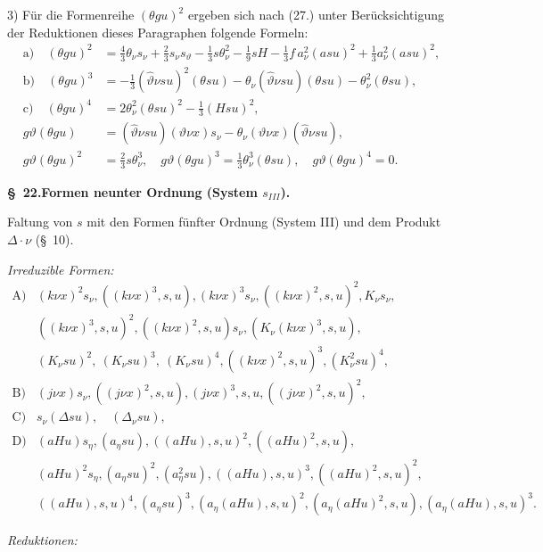 \documentclass[11pt]{article}
\newcommand{\A}{\Delta}
\begin{document}
3) Für die Formenreihe $(\theta gu)^2$ ergeben sich nach (27.) unter Berücksichtigung der Reduktionen dieses Paragraphen folgende Formeln:
\[
\tag{29}
\begin{aligned}
\text{a)}\quad (\theta gu)^2&=\frac43\theta_\nu s_\nu+\frac23s_\nu s_\vartheta-\frac13s\theta_\nu^2-\frac19sH-\frac13f\,a_\nu^2(asu)^2+\frac13a_\nu^2(asu)^2,\\
\text{b)}\quad (\theta gu)^3&=-\frac13(\widehat\vartheta\nu su)^2(\theta su)-\theta_\nu(\widehat\vartheta\nu su)(\theta su)-\theta_\nu^2(\theta su),\\
\text{c)}\quad (\theta gu)^4&=2\theta_\nu^2(\theta su)^2-\frac13(Hsu)^2,\\
g\vartheta(\theta gu)&=(\widehat\vartheta\nu su)(\vartheta\nu x)s_\nu-\theta_\nu(\vartheta\nu x)(\widehat\vartheta\nu su),\\
g\vartheta(\theta gu)^2&=\frac23s\theta_\nu^3,
\quad g\vartheta(\theta gu)^3=\frac13\theta_\nu^3(\theta su),
\quad g\vartheta(\theta gu)^4=0.
\end{aligned}
\]

\begin{center}
\textbf{\S\ 22.\quad Formen neunter Ordnung (System $s_{III}$).}
\end{center}

Faltung von $s$ mit den Formen fünfter Ordnung (System III) und dem Produkt $\A\cdot\nu$ (\S\ 10).

\noindent\emph{Irreduzible Formen:}
\[
\begin{array}{ll}
\text{A)}& (k\nu x)^2s_\nu,
((k\nu x)^3,s,u),
(k\nu x)^3s_\nu,
((k\nu x)^2,s,u)^2,
K_\nu s_\nu,\\
& ((k\nu x)^3,s,u)^2,
((k\nu x)^2,s,u)s_\nu,
(K_\nu(k\nu x)^3,s,u),\\
& (K_\nu su)^2,\ (K_\nu su)^3,\ (K_\nu su)^4,
((k\nu x)^2,s,u)^3,
(K_\nu^2su)^4,\\[0.3em]
\text{B)}& (j\nu x)s_\nu,
((j\nu x)^2,s,u),
(j\nu x)^3,s,u,
((j\nu x)^2,s,u)^2,\\[0.3em]
\text{C)}& s_\nu(\A su),\quad (\A_\nu su),\\[0.3em]
\text{D)}& (aHu)s_\eta,
(a_\eta su),
((aHu),s,u)^2,
((aHu)^2,s,u),\\
& (aHu)^2s_\eta,
(a_\eta su)^2,
(a_\eta^2su),
((aHu),s,u)^3,
((aHu)^2,s,u)^2,\\
& ((aHu),s,u)^4,
(a_\eta su)^3,
(a_\eta(aHu),s,u)^2,
(a_\eta(aHu)^2,s,u),
(a_\eta(aHu),s,u)^3.
\end{array}
\]

\noindent\emph{Reduktionen:}
\end{document}
